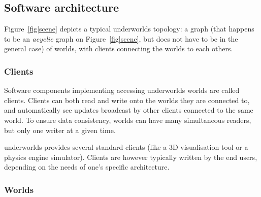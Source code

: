 \documentclass[letterpaper, 10pt, conference]{ieeeconf}
\newcommand{\uwds}{{\sc underworlds}\xspace}
\begin{document}
\subsection{Software architecture}

Figure~\ref{fig|scene} depicts a typical \uwds topology: a graph (that happens
to be an \emph{acyclic} graph on Figure~\ref{fig|scene}, but does not have to
be in the general case) of worlds, with clients connecting the worlds to each
others.

\subsubsection{Clients}

Software components implementing accessing \uwds worlds are
called clients. 
Clients can both read and write onto the worlds they are connected to, and
automatically see updates broadcast by other clients connected to the same
world. To ensure data consistency, worlds can have many simultaneous readers,
but only one writer at a given time.

\uwds provides several standard clients (like a 3D visualisation tool or a
physics engine simulator). Clients are however typically written by the end
users, depending on the needs of one's specific architecture.


\subsubsection{Worlds}
\end{document}
